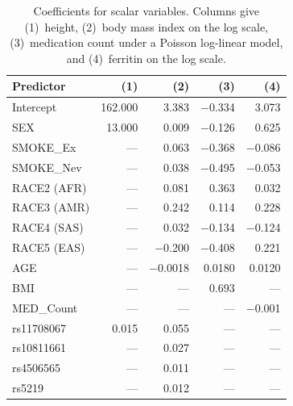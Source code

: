 \begin{table}[ht]
\centering
\caption{Coefficients for scalar variables. Columns give (1)~height, (2)~body mass index on the log scale, (3)~medication count under a Poisson log-linear model, and (4)~ferritin on the log scale.}
\label{tab:app_coef_scalar}
\small
\begin{tabular}{lrrrr}
\hline
\textbf{Predictor} & \textbf{(1)} & \textbf{(2)} &
\textbf{(3)} & \textbf{(4)} \\
\hline
Intercept        & 162.000 &  3.383 & $-$0.334 &  3.073 \\
SEX              &  13.000 &  0.009 & $-$0.126 &  0.625 \\
SMOKE\_Ex        &     --- &  0.063 & $-$0.368 & $-$0.086 \\
SMOKE\_Nev       &     --- &  0.038 & $-$0.495 & $-$0.053 \\
RACE2 (AFR)      &     --- &  0.081 &    0.363 &  0.032 \\
RACE3 (AMR)      &     --- &  0.242 &    0.114 &  0.228 \\
RACE4 (SAS)      &     --- &  0.032 & $-$0.134 & $-$0.124 \\
RACE5 (EAS)      &     --- & $-$0.200 & $-$0.408 &  0.221 \\
AGE              &     --- & $-$0.0018 &  0.0180 &  0.0120 \\
BMI              &     --- &    --- &    0.693 &    --- \\
MED\_Count       &     --- &    --- &      --- & $-$0.001 \\
rs11708067       &   0.015 &  0.055 &      --- &    --- \\
rs10811661       &     --- &  0.027 &      --- &    --- \\
rs4506565        &     --- &  0.011 &      --- &    --- \\
rs5219           &     --- &  0.012 &      --- &    --- \\
\hline
\end{tabular}
\end{table}

